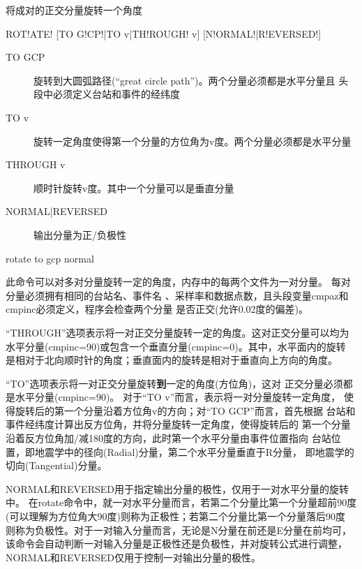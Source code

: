 \label{cmd:rotate}

将成对的正交分量旋转一个角度

\begin{SACSTX}
ROT!ATE! [TO G!CP!|TO v|TH!ROUGH! v] [N!ORMAL!|R!EVERSED!]
\end{SACSTX}

\begin{description}
\item [TO GCP] 旋转到大圆弧路径(``great circle path'')。两个分量必须都是水平分量且
    头段中必须定义台站和事件的经纬度
\item [TO v] 旋转一定角度使得第一个分量的方位角为v度。两个分量必须都是水平分量
\item [THROUGH v] 顺时针旋转v度。其中一个分量可以是垂直分量
\item [NORMAL|REVERSED] 输出分量为正/负极性
\end{description}

\begin{SACDFT}
rotate to gcp normal
\end{SACDFT}

此命令可以对多对分量旋转一定的角度，内存中的每两个文件为一对分量。
每对分量必须拥有相同的台站名、事件名
、采样率和数据点数，且头段变量cmpaz和cmpinc必须定义，程序会检查两个分量
是否正交(允许0.02度的偏差)。

``THROUGH''选项表示将一对正交分量旋转一定的角度。这对正交分量可以均为
水平分量(cmpinc=90)或包含一个垂直分量(cmpinc=0)。其中，水平面内的旋转
是相对于北向顺时针的角度；垂直面内的旋转是相对于垂直向上方向的角度。

``TO''选项表示将一对正交分量旋转\textbf{到}一定的角度(方位角)，这对
正交分量必须都是水平分量(cmpinc=90)。
对于``TO v''而言，表示将一对分量旋转一定角度，
使得旋转后的第一个分量沿着方位角v的方向；对``TO GCP''而言，首先根据
台站和事件经纬度计算出反方位角，并将分量旋转一定角度，使得旋转后的
第一个分量沿着反方位角加/减180度的方向，此时第一个水平分量由事件位置指向
台站位置，即地震学中的径向(Radial)分量，第二个水平分量垂直于R分量，
即地震学的切向(Tangential)分量。

NORMAL和REVERSED用于指定输出分量的极性，仅用于一对水平分量的旋转中。
在rotate命令中，就一对水平分量而言，若第二个分量比第一个分量超前90度
(可以理解为方位角大90度)则称为正极性；若第二个分量比第一个分量落后90度
则称为负极性。对于一对输入分量而言，无论是N分量在前还是E分量在前均可，
该命令会自动判断一对输入分量是正极性还是负极性，并对旋转公式进行调整，
NORMAL和REVERSED仅用于控制一对输出分量的极性。

